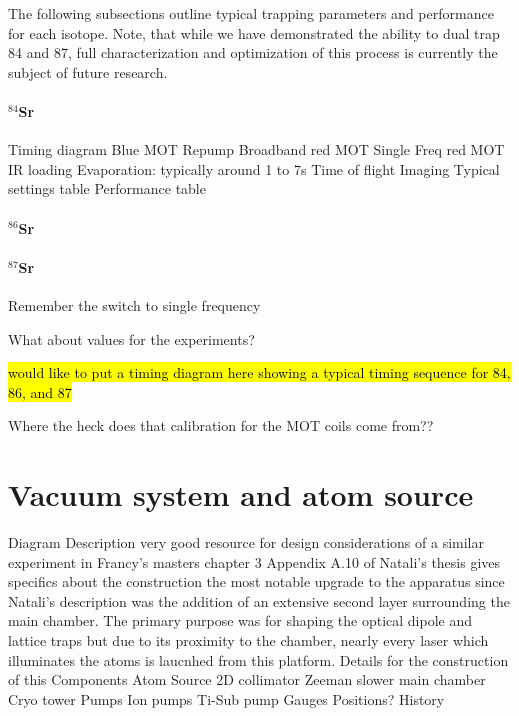 The following subsections outline typical trapping parameters and performance for each isotope. Note, that while we have demonstrated the ability to dual trap 84 and 87, full characterization and optimization of this process is currently the subject of future research.

\paragraph{$^{84}$Sr} \label{sec:84_trapping}

Timing diagram
	Blue MOT
	Repump
	Broadband red MOT
	Single Freq red MOT
	IR loading
	Evaporation: typically around 1 to 7s
	Time of flight
	Imaging
Typical settings table
Performance table

\paragraph{$^{86}$Sr} \label{sec:86_trapping}

\paragraph{$^{87}$Sr} \label{sec:87_trapping}


Remember the switch to single frequency

What about values for the experiments?

\hl{would like to put a timing diagram here showing a typical timing sequence for 84, 86, and 87}

Where the heck does that calibration for the MOT coils come from??



\section{Vacuum system and atom source} \label{sec:vac}

Diagram
Description
	very good resource for design considerations of a similar experiment in Francy's masters chapter 3
	Appendix A.10 of Natali's thesis gives specifics about the construction
		the most notable upgrade to the apparatus since Natali's description was the addition of an extensive second layer surrounding the main chamber. The primary purpose was for shaping the optical dipole and lattice traps but due to its proximity to the chamber, nearly every laser which illuminates the atoms is laucnhed from this platform. Details for the construction of this 
Components
	Atom Source
	2D collimator
	Zeeman slower
	main chamber
	Cryo tower
	Pumps
		Ion pumps
		Ti-Sub pump
	Gauges
		Positions?
History
	
